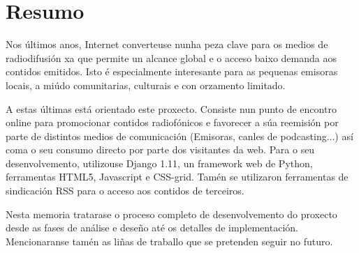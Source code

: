 \thispagestyle{plain}
\section*{Resumo}

Nos últimos anos, Internet converteuse nunha peza clave para os medios de radiodifusión xa que permite un alcance global e o acceso baixo demanda aos contidos emitidos. Isto é especialmente interesante para as pequenas emisoras locais, a miúdo comunitarias, culturais e con orzamento limitado.

A estas últimas está orientado este proxecto. Consiste nun punto de encontro online para promocionar contidos radiofónicos e favorecer a súa reemisión por parte de distintos medios de comunicación (Emisoras, canles de podcasting...) así coma o seu consumo directo por parte dos visitantes da web. Para o seu desenvolvemento, utilizouse Django 1.11, un framework web de Python, ferramentas HTML5, Javascript e CSS-grid. Tamén se utilizaron ferramentas de sindicación RSS para o acceso aos contidos de terceiros.

Nesta memoria tratarase o proceso completo de desenvolvemento do proxecto desde as fases de análise e deseño até os detalles de implementación. Mencionaranse tamén as liñas de traballo que se pretenden seguir no futuro.

   
